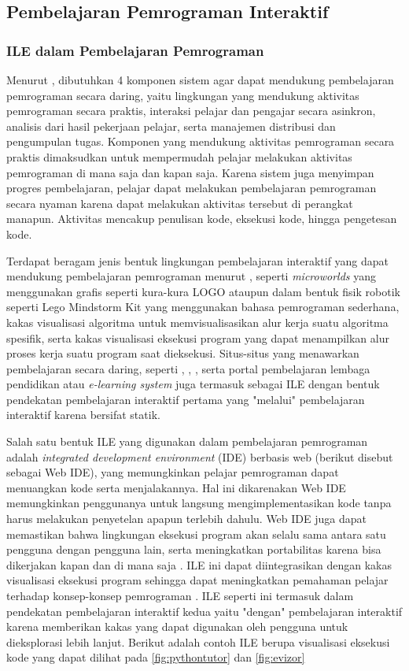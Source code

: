 \subsection{Pembelajaran Pemrograman Interaktif}
\subsubsection{ILE dalam Pembelajaran Pemrograman}
Menurut \textcite{choy2004interactive}, dibutuhkan 4 komponen sistem agar dapat mendukung pembelajaran pemrograman secara daring, yaitu lingkungan yang mendukung aktivitas pemrograman secara praktis, interaksi pelajar dan pengajar secara asinkron, analisis dari hasil pekerjaan pelajar, serta manajemen distribusi dan pengumpulan tugas. Komponen yang mendukung aktivitas pemrograman secara praktis dimaksudkan untuk mempermudah pelajar melakukan aktivitas pemrograman di mana saja dan kapan saja. Karena sistem juga menyimpan progres pembelajaran, pelajar dapat melakukan pembelajaran pemrograman secara nyaman karena dapat melakukan aktivitas tersebut di perangkat manapun. Aktivitas mencakup penulisan kode, eksekusi kode, hingga pengetesan kode.

Terdapat beragam jenis bentuk lingkungan pembelajaran interaktif yang dapat mendukung pembelajaran pemrograman menurut \textcite{moons2013pilot}, seperti \textit{microworlds} yang menggunakan grafis seperti kura-kura LOGO ataupun dalam bentuk fisik robotik seperti Lego Mindstorm Kit yang menggunakan bahasa pemrograman sederhana, kakas visualisasi algoritma untuk memvisualisasikan alur kerja suatu algoritma spesifik, serta kakas visualisasi eksekusi program yang dapat menampilkan alur proses kerja suatu program saat dieksekusi. Situs-situs yang menawarkan pembelajaran secara daring, seperti \textcite{sololearn2021media}, \textcite{codesaya2021media}, \textcite{brilliant2021media}, serta portal pembelajaran lembaga pendidikan atau \textit{e-learning system} juga termasuk sebagai ILE dengan bentuk pendekatan pembelajaran interaktif pertama yang "melalui" pembelajaran interaktif karena bersifat statik.

Salah satu bentuk ILE yang digunakan dalam pembelajaran pemrograman adalah \textit{integrated development environment} (IDE) berbasis web (berikut disebut sebagai Web IDE), yang memungkinkan pelajar pemrograman dapat menuangkan kode serta menjalakannya. Hal ini dikarenakan Web IDE memungkinkan penggunanya untuk langsung mengimplementasikan kode tanpa harus melakukan penyetelan apapun terlebih dahulu. Web IDE juga dapat memastikan bahwa lingkungan eksekusi program akan selalu sama antara satu pengguna dengan pengguna lain, serta meningkatkan portabilitas karena bisa dikerjakan kapan dan di mana saja \parencite{tran2013interactive}. ILE ini dapat diintegrasikan dengan kakas visualisasi eksekusi program sehingga dapat meningkatkan pemahaman pelajar terhadap konsep-konsep pemrograman \parencite{moons2013pilot}. ILE seperti ini termasuk dalam pendekatan pembelajaran interaktif kedua yaitu "dengan" pembelajaran interaktif karena memberikan kakas yang dapat digunakan oleh pengguna untuk dieksplorasi lebih lanjut. Berikut adalah contoh ILE berupa visualisasi eksekusi kode yang dapat dilihat pada \autoref{fig:pythontutor} dan \autoref{fig:evizor}

